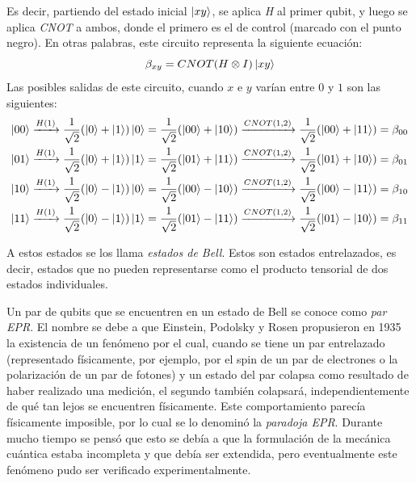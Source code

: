 Es decir, partiendo del estado inicial \( \ket{xy} \), se aplica \textit{H} al primer qubit, y luego se aplica \textit{CNOT} a ambos, donde el primero es el de control (marcado con el punto negro). En otras palabras, este circuito representa la siguiente ecuación:
\[
  \beta_{xy} = CNOT(H \otimes I)\ket{xy}
\]
Las posibles salidas de este circuito, cuando \( x \) e \( y \) varían entre \( 0 \) y \( 1 \) son las siguientes:
\begin{equation*}
  \begin{split}
    \ket{00} \xrightarrow{H(1)} \frac{1}{\sqrt{2}} (\ket{0} + \ket{1})\ket{0} = \frac{1}{\sqrt{2}} (\ket{00} + \ket{10}) \xrightarrow{CNOT(1,2)} \frac{1}{\sqrt{2}} (\ket{00} + \ket{11}) = \beta_{00} \\
    \ket{01} \xrightarrow{H(1)} \frac{1}{\sqrt{2}} (\ket{0} + \ket{1})\ket{1} = \frac{1}{\sqrt{2}} (\ket{01} + \ket{11}) \xrightarrow{CNOT(1,2)} \frac{1}{\sqrt{2}} (\ket{01} + \ket{10}) = \beta_{01} \\
    \ket{10} \xrightarrow{H(1)} \frac{1}{\sqrt{2}} (\ket{0} - \ket{1})\ket{0} = \frac{1}{\sqrt{2}} (\ket{00} - \ket{10}) \xrightarrow{CNOT(1,2)} \frac{1}{\sqrt{2}} (\ket{00} - \ket{11}) = \beta_{10} \\
    \ket{11} \xrightarrow{H(1)} \frac{1}{\sqrt{2}} (\ket{0} - \ket{1})\ket{1} = \frac{1}{\sqrt{2}} (\ket{01} - \ket{11}) \xrightarrow{CNOT(1,2)} \frac{1}{\sqrt{2}} (\ket{01} - \ket{10}) = \beta_{11}
  \end{split}
\end{equation*}

A estos estados se los llama \textit{estados de Bell}. Estos son
estados entrelazados, es decir, estados que no pueden representarse como el producto tensorial de dos estados individuales.

Un par de qubits que se encuentren en un estado de Bell se conoce como \textit{par EPR}. El nombre se debe a que Einstein, Podolsky y Rosen propusieron en 1935 la existencia de un fenómeno por el cual, cuando se tiene un par entrelazado (representado físicamente, por ejemplo, por el spin de un par de electrones o la polarización de un par de fotones) y un estado del par colapsa como resultado de haber realizado una medición, el segundo también colapsará, independientemente de qué tan lejos se encuentren físicamente. Este comportamiento parecía físicamente imposible, por lo cual se lo denominó la \textit{paradoja EPR}. Durante mucho tiempo se pensó que esto se debía a que la formulación de la mecánica cuántica estaba incompleta y que debía ser extendida, pero eventualmente este fenómeno pudo ser verificado experimentalmente.

